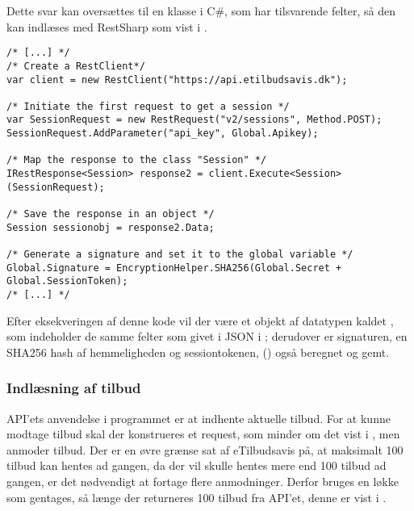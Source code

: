 Dette svar kan oversættes til en klasse i C\#, som har tilsvarende felter, så den kan indlæses med RestSharp som vist i .

\begin{lstlisting}[caption=C\#-kode som opretter en RestClient og anvender den til at oprette et objekt med felter som svarer til JSON dataet givet fra API'en, label=lst:session]
/* [...] */
/* Create a RestClient*/
var client = new RestClient("https://api.etilbudsavis.dk");

/* Initiate the first request to get a session */
var SessionRequest = new RestRequest("v2/sessions", Method.POST);
SessionRequest.AddParameter("api_key", Global.Apikey);

/* Map the response to the class "Session" */
IRestResponse<Session> response2 = client.Execute<Session>(SessionRequest);

/* Save the response in an object */
Session sessionobj = response2.Data;

/* Generate a signature and set it to the global variable */
Global.Signature = EncryptionHelper.SHA256(Global.Secret + Global.SessionToken);
/* [...] */
\end{lstlisting}
Efter eksekveringen af denne kode vil der være et objekt af datatypen  kaldet , som indeholder de samme felter som givet i JSON i ; derudover er signaturen, en SHA256 hash af hemmeligheden og sessiontokenen, () også beregnet og gemt.

\subsubsection{Indlæsning af tilbud}
API'ets anvendelse i programmet er at indhente aktuelle tilbud.
For at kunne modtage tilbud skal der konstrueres et request, som minder om det vist i , men anmoder tilbud.
Der er en øvre grænse sat af eTilbudsavis på, at maksimalt 100 tilbud kan hentes ad gangen, da der vil skulle hentes mere end 100 tilbud ad gangen, er det nødvendigt at fortage flere anmodninger.
Derfor bruges en  løkke som gentages, så længe der returneres 100 tilbud fra API'et, denne er vist i .

